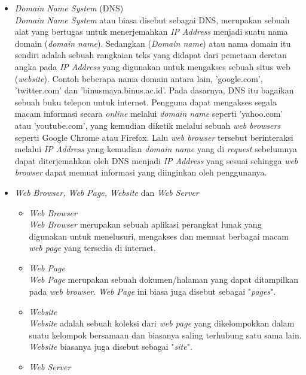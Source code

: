 \documentclass[a4paper]{article}
\begin{document}
\begin{itemize}
    \item \textit{Domain Name System} (DNS)\\
    \textit{Domain Name System} atau biasa disebut sebagai DNS, merupakan sebuah alat yang bertugas untuk menerjemahkan \textit{IP Address} menjadi suatu nama domain (\textit{domain name})\autocite{what-is-dns}. Sedangkan (\textit{Domain name}) atau nama domain itu sendiri adalah sebuah rangkaian teks yang didapat dari pemetaan deretan angka pada \textit{IP Address} yang digunakan untuk mengakses sebuah situs web (\textit{website}). Contoh beberapa nama domain antara lain, 'google.com', 'twitter.com' dan 'binusmaya.binus.ac.id'\autocite{what-is-domain-name}. Pada dasarnya, DNS itu bagaikan sebuah buku telepon untuk internet. Pengguna dapat mengakses segala macam informasi secara \textit{online} melalui \textit{domain name} seperti 'yahoo.com' atau 'youtube.com', yang kemudian diketik melalui sebuah \textit{web browsers} seperti Google Chrome atau Firefox. Lalu \textit{web browser} tersebut berinteraksi melalui \textit{IP Address} yang kemudian \textit{domain name} yang di \textit{request} sebelumnya dapat diterjemahkan oleh DNS menjadi \textit{IP Address} yang sesuai sehingga \textit{web browser} dapat memuat informasi yang diinginkan oleh penggunanya\autocite{what-is-dns}.
    \item \textit{Web Browser, Web Page, Website} dan \textit{Web Server}
    \begin{itemize}
        \item \textit{Web Browser}\\
        \textit{Web Browser} merupakan sebuah aplikasi perangkat lunak yang digunakan untuk menelusuri, mengakses dan memuat berbagai macam \textit{web page} yang tersedia di internet\autocite{web-browsers}.
        \item \textit{Web Page}\\
        \textit{Web Page} merupakan sebuah dokumen/halaman yang dapat ditampilkan pada \textit{web browser}. \textit{Web Page} ini biasa juga disebut sebagai "\textit{pages}"\autocite{webpage-website-webserver}.
        \item \textit{Website}\\
        \textit{Website} adalah sebuah koleksi dari \textit{web page} yang dikelompokkan dalam suatu kelompok bersamaan dan biasanya saling terhubung satu sama lain. \textit{Website} biasanya juga disebut sebagai "\textit{site}"\autocite{webpage-website-webserver}.
        \item \textit{Web Server}\\

\end{itemize}
\end{itemize}
\end{document}
